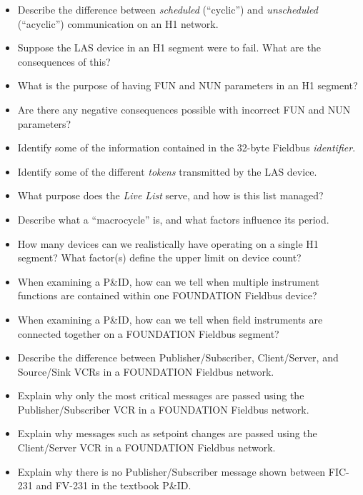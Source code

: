 \begin{itemize}
\item{} Describe the difference between {\it scheduled} (``cyclic'') and {\it unscheduled} (``acyclic'') communication on an H1 network.
\item{} Suppose the LAS device in an H1 segment were to fail.  What are the consequences of this?
\item{} What is the purpose of having FUN and NUN parameters in an H1 segment?
\item{} Are there any negative consequences possible with incorrect FUN and NUN parameters?
\item{} Identify some of the information contained in the 32-byte Fieldbus {\it identifier}.
\item{} Identify some of the different {\it tokens} transmitted by the LAS device.
\item{} What purpose does the {\it Live List} serve, and how is this list managed?
\item{} Describe what a ``macrocycle'' is, and what factors influence its period.
\item{} How many devices can we realistically have operating on a single H1 segment?  What factor(s) define the upper limit on device count?
\item{} When examining a P\&ID, how can we tell when multiple instrument functions are contained within one FOUNDATION Fieldbus device?
\item{} When examining a P\&ID, how can we tell when field instruments are connected together on a FOUNDATION Fieldbus segment?
\item{} Describe the difference between Publisher/Subscriber, Client/Server, and Source/Sink VCRs in a FOUNDATION Fieldbus network.
\item{} Explain why only the most critical messages are passed using the Publisher/Subscriber VCR in a FOUNDATION Fieldbus network.
\item{} Explain why messages such as setpoint changes are passed using the Client/Server VCR in a FOUNDATION Fieldbus network.
\item{} Explain why there is no Publisher/Subscriber message shown between FIC-231 and FV-231 in the textbook P\&ID.
\end{itemize}

















